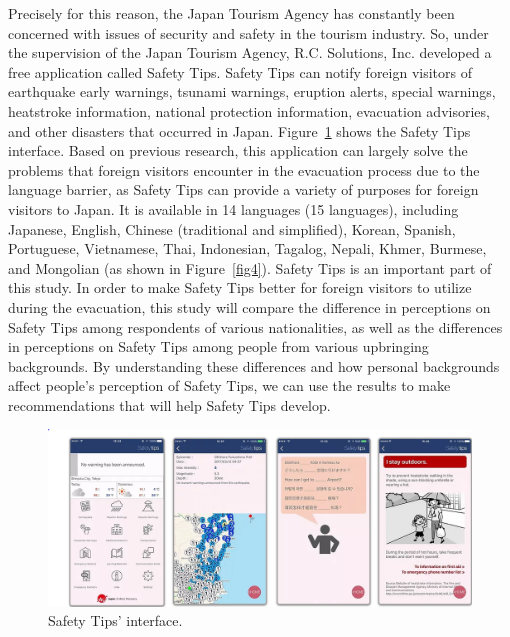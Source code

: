 Precisely for this reason, the Japan Tourism Agency has constantly been concerned with issues of security and safety in the tourism industry. So, under the supervision of the Japan Tourism Agency, R.C. Solutions, Inc. developed a free application called Safety Tips. Safety Tips can notify foreign visitors of earthquake early warnings, tsunami warnings, eruption alerts, special warnings, heatstroke information, national protection information, evacuation advisories, and other disasters that occurred in Japan. Figure~\ref{fig3} shows the Safety Tips interface.  Based on previous research, this application can largely solve the problems that foreign visitors encounter in the evacuation process due to the language barrier, as Safety Tips can provide a variety of purposes for foreign visitors to Japan. It is available in 14 languages (15 languages), including Japanese, English, Chinese (traditional and simplified), Korean, Spanish, Portuguese, Vietnamese, Thai, Indonesian, Tagalog, Nepali, Khmer, Burmese, and Mongolian (as shown in Figure~\ref{fig4}). Safety Tips is an important part of this study. In order to make Safety Tips better for foreign visitors to utilize during the evacuation, this study will compare the difference in perceptions on Safety Tips among respondents of various nationalities, as well as the differences in perceptions on Safety Tips among people from various upbringing backgrounds. By understanding these differences and how personal backgrounds affect people's perception of Safety Tips, we can use the results to make recommendations that will help Safety Tips develop.






\begin{figure}[h]
  \includegraphics[width=\linewidth]{Figure/Figure3.png}
  \centering
  \caption[Safety Tips' interface]{Safety Tips' interface.\protect\footnotemark }
  \label{fig3}
\end{figure}


